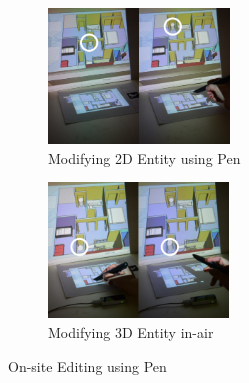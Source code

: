 
\begin{figure}[h!]
    \centering
        \begin{subfigure}[b]{0.49\columnwidth}
            \centering
                \includegraphics[width=1.0\columnwidth, height=3.6cm]{4-Interaction_Design/2d_move}
                \caption{Modifying 2D Entity using Pen}
                \label{fig:Pen_move}
        \end{subfigure}%
        \hfill
        \begin{subfigure}[b]{0.49\columnwidth}
            \centering
            \includegraphics[width=1.0\columnwidth, height=3.6cm]{4-Interaction_Design/3d_note}
                \caption{Modifying 3D Entity in-air}
                \label{fig:Annotation}
        \end{subfigure}
    \caption{On-site Editing using Pen}
    \label{fig:edit}
\end{figure}

